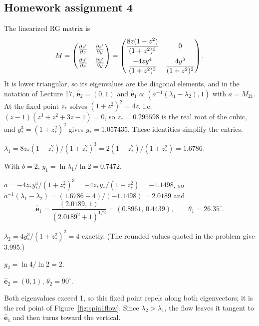 \subsection{Homework assignment 4}

The linearized RG matrix is
\begin{equation}
  M = \begin{pmatrix}\frac{\partial z'}{\partial z} & \frac{\partial z'}{\partial y}\\[6pt] \frac{\partial y'}{\partial z} & \frac{\partial y'}{\partial y}\end{pmatrix}
  = \begin{pmatrix}\dfrac{8z(1-z^2)}{(1+z^2)^3} & 0\\[10pt] \dfrac{-4zy^4}{(1+z^2)^3} & \dfrac{4y^3}{(1+z^2)^2}\end{pmatrix}.
\end{equation}
It is lower triangular, so its eigenvalues are the diagonal elements, and in the notation of Lecture 17,
$\hat{\mathbf e}_2 = (0,1)$ and $\hat{\mathbf e}_1\propto\left(a^{-1}(\lambda_1-\lambda_2),1\right)$ with $a = M_{21}$.
At the fixed point $z_*$ solves $(1+z^2)^2 = 4z$, i.e.\ $(z-1)(z^3+z^2+3z-1) = 0$, so $z_* = 0.295598$ is the real root
of the cubic, and $y_*^3 = (1+z_*^2)^2$ gives $y_* = 1.057435$. These identities simplify the entries.

 $\lambda_1 = 8z_*(1-z_*^2)/(1+z_*^2)^3 = 2(1-z_*^2)/(1+z_*^2) = 1.6786$.

 With $b = 2$, $y_1 = \ln\lambda_1/\ln 2 = 0.7472$.

 $a = -4z_*y_*^4/(1+z_*^2)^3 = -4z_*y_*/(1+z_*^2) = -1.1498$, so
$a^{-1}(\lambda_1-\lambda_2) = (1.6786-4)/(-1.1498) = 2.0189$ and
\begin{equation}
  \hat{\mathbf e}_1 = \frac{(2.0189,\,1)}{\left(2.0189^2+1\right)^{1/2}} = (0.8961,\,0.4439),\qquad
  \theta_1 = 26.35^\circ .
\end{equation}

 $\lambda_2 = 4y_*^3/(1+z_*^2)^2 = 4$ exactly. (The rounded values quoted in the problem give 3.995.)

 $y_2 = \ln 4/\ln 2 = 2$.

 $\hat{\mathbf e}_2 = (0,1)$, $\theta_2 = 90^\circ$.

Both eigenvalues exceed 1, so this fixed point repels along both eigenvectors; it is the red point of
Figure~\ref{fig:spin1flow}. Since $\lambda_2>\lambda_1$, the flow leaves it tangent to $\hat{\mathbf e}_1$ and then
turns toward the vertical.

